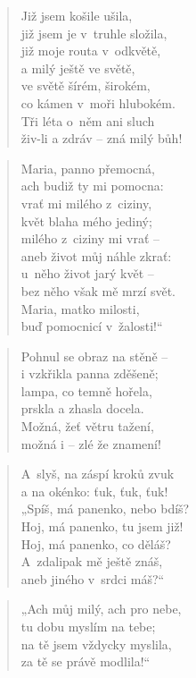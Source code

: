\begin{verse}
Již jsem košile ušila, \\
již jsem je v~truhle složila, \\
již moje routa v~odkvětě, \\
a milý ještě ve světě, \\
ve světě šírém, širokém, \\
co kámen v~moři hlubokém. \\
Tři léta o~něm ani sluch \\
živ-li a zdráv -- zná milý bůh!
\end{verse}

\begin{verse}
Maria, panno přemocná, \\
ach budiž ty mi pomocna: \\
vrať mi milého z~ciziny, \\
květ blaha mého jediný; \\
milého z~ciziny mi vrať -- \\
aneb život můj náhle zkrať: \\
u~něho život jarý květ -- \\
bez něho však mě mrzí svět. \\
Maria, matko milosti, \\
buď pomocnicí v~žalosti!“
\end{verse}

\begin{verse}
Pohnul se obraz na stěně -- \\
i vzkřikla panna zděšeně; \\
lampa, co temně hořela, \\
prskla a zhasla docela. \\
Možná, žeť větru tažení, \\
možná i -- zlé že znamení!
\end{verse}

\begin{verse}
A~slyš, na záspí kroků zvuk \\
a na okénko: ťuk, ťuk, ťuk! \\
„Spíš, má panenko, nebo bdíš? \\
Hoj, má panenko, tu jsem již! \\
Hoj, má panenko, co děláš? \\
A~zdalipak mě ještě znáš, \\
aneb jiného v~srdci máš?“
\end{verse}

\begin{verse}
„Ach můj milý, ach pro nebe, \\
tu dobu myslím na tebe; \\
na tě jsem vždycky myslila, \\
za tě se právě modlila!“
\end{verse}

